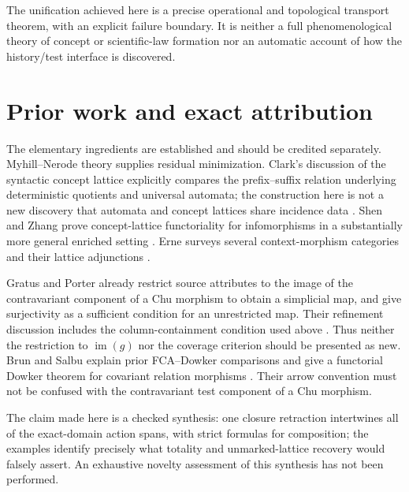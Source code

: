 \documentclass[11pt]{article}
\theoremstyle{remark}
\begin{document}
The unification achieved here is a precise operational and topological
transport theorem, with an explicit failure boundary. It is neither a
full phenomenological theory of concept or scientific-law formation nor
an automatic account of how the history/test interface is discovered.
\section{Prior work and exact attribution}
\label{nb:prior}

The elementary ingredients are established and should be credited
separately. Myhill--Nerode theory supplies residual minimization.
Clark's discussion of the syntactic concept lattice explicitly compares
the prefix--suffix relation underlying deterministic quotients and
universal automata; the construction here is not a new discovery that
automata and concept lattices share incidence data
\cite{nb:clark}. Shen and Zhang prove concept-lattice functoriality for
infomorphisms in a substantially more general enriched setting
\cite{nb:shen-zhang}. Erne surveys several context-morphism categories and
their lattice adjunctions \cite{nb:erne}.

Gratus and Porter already restrict source attributes to the image of
the contravariant component of a Chu morphism to obtain a simplicial
map, and give surjectivity as a sufficient condition for an unrestricted
map. Their refinement discussion includes the column-containment
condition used above \cite{nb:gratus-porter}. Thus neither the restriction
to $\operatorname{im}(g)$ nor the coverage criterion should be presented
as new. Brun and Salbu explain prior FCA--Dowker comparisons and give a
functorial Dowker theorem for covariant relation morphisms
\cite{nb:brun-salbu}. Their arrow convention must not be confused with
the contravariant test component of a Chu morphism.

The claim made here is a checked synthesis: one closure retraction
intertwines all of the exact-domain action spans, with strict formulas
for composition; the examples identify precisely what totality and
unmarked-lattice recovery would falsely assert. An exhaustive novelty
assessment of this synthesis has not been performed.
\end{document}
